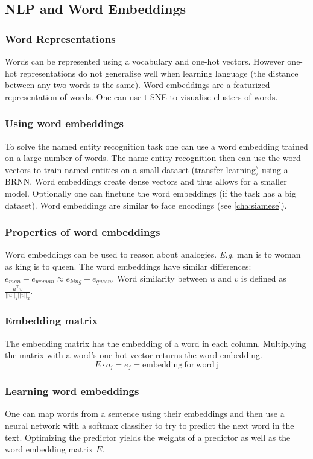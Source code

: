 \documentclass{article}
\begin{document}
\subsection{NLP and Word Embeddings}
\subsubsection{Word Representations}
Words can be represented using a vocabulary and one-hot vectors.
However one-hot representations do not generalise well when learning language
(the distance between any two words is the same).
Word embeddings are a featurized representation of words.
One can use t-SNE to visualise clusters of words.

\subsubsection{Using word embeddings}
To solve the named entity recognition task one can use a word embedding trained on a large number of words.
The name entity recognition then can use the word vectors to train named entities on a small dataset (transfer learning)
using a BRNN.
Word embeddings create dense vectors and thus allows for a smaller model.
Optionally one can finetune the word embeddings (if the task has a big dataset).
Word embeddings are similar to face encodings (see \cref{cha:siamese}).

\subsubsection{Properties of word embeddings}
Word embeddings can be used to reason about analogies.
\emph{E.g.} man is to woman as king is to queen.
The word embeddings have similar differences: $e_{man}-e_{woman}\approx e_{king}-e_{queen}$.
Word similarity between $u$ and $v$ is defined as $\frac{u^\top v}{||u||_2||v||_2}$.

\subsubsection{Embedding matrix}
The embedding matrix has the embedding of a word in each column.
Multiplying the matrix with a word's one-hot vector returns the word embedding.
\begin{equation}
  E\cdot o_j=e_j=\mathrm{embedding\ for\ word\ j}
\end{equation}

\subsubsection{Learning word embeddings}
One can map words from a sentence using their embeddings and then
use a neural network with a softmax classifier to try to predict the next word in the text.
Optimizing the predictor yields the weights of a predictor as well as the word embedding matrix $E$.
\end{document}
